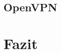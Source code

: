\documentclass[
a4paper,     %
 headsepline, %
footsepline, %
titlepage,   %
 halfparskip,     %
 fleqn,       %
12pt         %
]{scrartcl}  %
\begin{document}
\subsection{OpenVPN}\label{openvpn}
\label{Lösungsskizze}
\label{Auswertung}
\section{Fazit}\label{Fazit}



 \appendix  %

 

 
\end{document}
